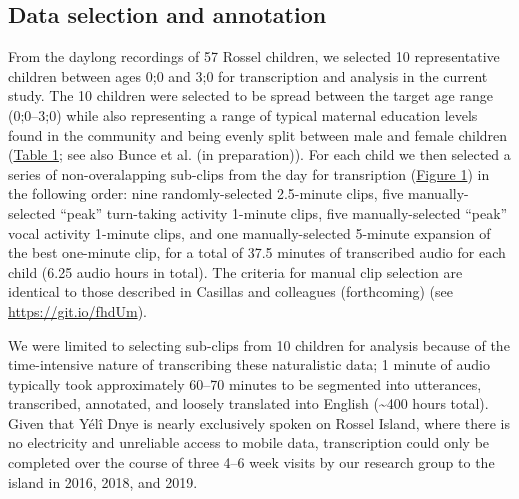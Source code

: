 \documentclass[,man,floatsintext]{apa6}
\begin{document}
\subsection{Data selection and annotation}\label{methods-samples}

From the daylong recordings of 57 Rossel children, we selected 10
representative children between ages 0;0 and 3;0 for transcription and
analysis in the current study. The 10 children were selected to be
spread between the target age range (0;0--3;0) while also representing a
range of typical maternal education levels found in the community and
being evenly split between male and female children
(\protect\hyperlink{tab1}{Table 1}; see also Bunce et al. (in
preparation)). For each child we then selected a series of
non-overalapping sub-clips from the day for transription
(\protect\hyperlink{fig1}{Figure 1}) in the following order: nine
randomly-selected 2.5-minute clips, five manually-selected
\enquote{peak} turn-taking activity 1-minute clips, five
manually-selected \enquote{peak} vocal activity 1-minute clips, and one
manually-selected 5-minute expansion of the best one-minute clip, for a
total of 37.5 minutes of transcribed audio for each child (6.25 audio
hours in total). The criteria for manual clip selection are identical to
those described in Casillas and colleagues (forthcoming) (see
\url{https://git.io/fhdUm}).

We were limited to selecting sub-clips from 10 children for analysis
because of the time-intensive nature of transcribing these naturalistic
data; 1 minute of audio typically took approximately 60--70 minutes to
be segmented into utterances, transcribed, annotated, and loosely
translated into English (\textasciitilde{}400 hours total). Given that
Yélî Dnye is nearly exclusively spoken on Rossel Island, where there is
no electricity and unreliable access to mobile data, transcription could
only be completed over the course of three 4--6 week visits by our
research group to the island in 2016, 2018, and 2019.
\end{document}
